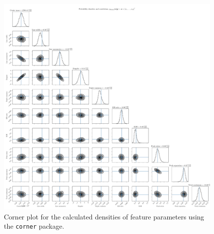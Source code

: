 \documentclass[a4paper,12pt]{report}
\begin{document}

\begin{figure}[h!]
\centering
\includegraphics[width=\textwidth]{figures/nf-feature-extraction-example-1-corner.pdf}
\cprotect\caption{Corner plot for the calculated densities of feature parameters using the \verb|corner| package.}
\label{fig:nf-feature-extraction-example-1-corner}
\end{figure}
\end{document}

